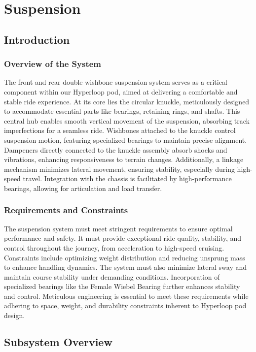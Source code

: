 
\section{Suspension}

\subsection{Introduction}
\subsubsection{Overview of the System}
The front and rear double wishbone suspension system serves as a critical component within our Hyperloop pod, aimed at delivering a comfortable and stable ride experience. At its core lies the circular knuckle, meticulously designed to accommodate essential parts like bearings, retaining rings, and shafts. This central hub enables smooth vertical movement of the suspension, absorbing track imperfections for a seamless ride. Wishbones attached to the knuckle control suspension motion, featuring specialized bearings to maintain precise alignment. Dampeners directly connected to the knuckle assembly absorb shocks and vibrations, enhancing responsiveness to terrain changes. Additionally, a linkage mechanism minimizes lateral movement, ensuring stability, especially during high-speed travel. Integration with the chassis is facilitated by high-performance bearings, allowing for articulation and load transfer.

\subsubsection{Requirements and Constraints}
The suspension system must meet stringent requirements to ensure optimal performance and safety. It must provide exceptional ride quality, stability, and control throughout the journey, from acceleration to high-speed cruising. Constraints include optimizing weight distribution and reducing unsprung mass to enhance handling dynamics. The system must also minimize lateral sway and maintain course stability under demanding conditions. Incorporation of specialized bearings like the Female Wiebel Bearing further enhances stability and control. Meticulous engineering is essential to meet these requirements while adhering to space, weight, and durability constraints inherent to Hyperloop pod design.

\subsection{Subsystem Overview}
